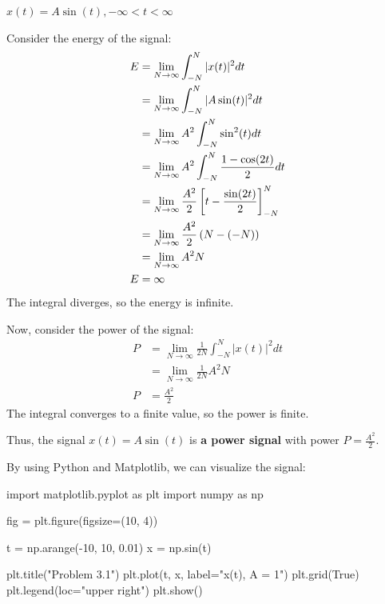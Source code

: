 \documentclass[a4paper, 10pt]{article}
\begin{document}
\begin{subproblems}
    \item \( x(t) = A\sin( t ), -\infty < t < \infty \)
\end{subproblems}

\begin{solution}
Consider the energy of the signal:
\begin{align*}
    E &= \lim_{N \to \infty} \int_{-N}^{N} |x(t)|^2 dt \\
    &= \lim_{N \to \infty} \int_{-N}^{N} |A\sin(t)|^2 dt \\
    &= \lim_{N \to \infty} A^2 \int_{-N}^{N} \sin^2(t) dt \\
    &= \lim_{N \to \infty} A^2 \int_{-N}^{N} \frac{1 - \cos(2t)}{2} dt \\
    &= \lim_{N \to \infty} \frac{A^2}{2} \left[ t - \frac{\sin(2t)}{2} \right]_{-N}^{N} \\
    &= \lim_{N \to \infty} \frac{A^2}{2} \left( N - (-N) \right) \\
    &= \lim_{N \to \infty} A^2 N \\
    E &= \infty
\end{align*}
The integral diverges, so the energy is infinite.

\vspace{5mm}

Now, consider the power of the signal:
\begin{align*}
    P &= \lim_{N \to \infty} \frac{1}{2N} \int_{-N}^{N} |x(t)|^2 dt \\
    &= \lim_{N \to \infty} \frac{1}{2N} A^2 N \\
    P &= \frac{A^2}{2}
\end{align*}
The integral converges to a finite value, so the power is finite.

\vspace{2mm}

Thus, the signal \( x(t) = A\sin( t ) \) is \textbf{a power signal} with power \( P = \frac{A^2}{2} \).

\vspace{2mm}

By using Python and Matplotlib, we can visualize the signal:
\begin{codingbox}
import matplotlib.pyplot as plt
import numpy as np

fig = plt.figure(figsize=(10, 4))

t = np.arange(-10, 10, 0.01)
x = np.sin(t)

plt.title("Problem 3.1")
plt.plot(t, x, label="x(t), A = 1")
plt.grid(True)
plt.legend(loc="upper right")
plt.show()
\end{codingbox}


\end{solution}
\end{document}
